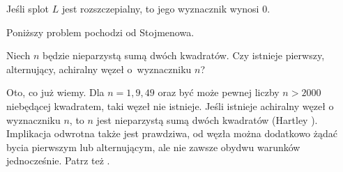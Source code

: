 \begin{corollary}
%
    Jeśli splot $L$ jest rozszczepialny, to jego wyznacznik wynosi $0$.
\end{corollary}

Poniższy problem pochodzi od Stojmenowa.
%

\begin{conjecture}
    Niech $n$ będzie nieparzystą sumą dwóch kwadratów.
    Czy istnieje pierwszy, alternujący, achiralny węzeł o~wyznaczniku $n$?
\end{conjecture}

Oto, co już wiemy.
Dla $n = 1, 9, 49$ oraz być może pewnej liczby $n > 2000$ niebędącej kwadratem, taki węzeł nie istnieje.
Jeśli istnieje achiralny węzeł o wyznaczniku $n$, to $n$ jest nieparzystą sumą dwóch kwadratów (Hartley \cite{hartley79}).
%
Implikacja odwrotna także jest prawdziwa, od węzła można dodatkowo żądać bycia pierwszym lub alternującym, ale nie zawsze obydwu warunków jednocześnie.
Patrz też \cite{stoimenow05}.
%


